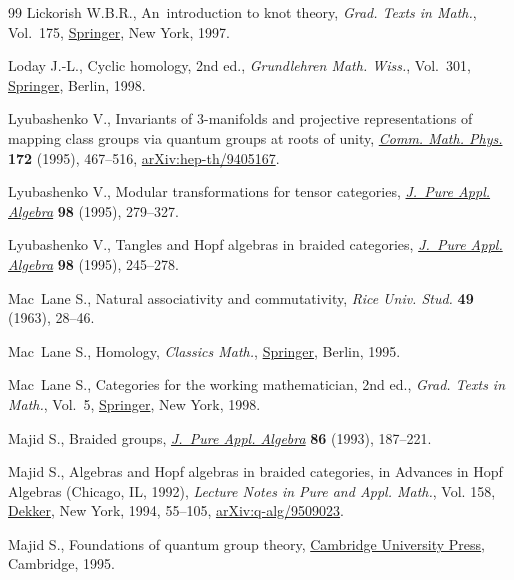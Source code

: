 \begin{thebibliography}{99}
Lickorish W.B.R., An~introduction to knot theory, \textit{Grad. Texts in
 Math.}, Vol.~175, \href{https://doi.org/10.1007/978-1-4612-0691-0}{Springer},
 New York, 1997.

Loday J.-L., Cyclic homology, 2nd ed., \textit{Grundlehren Math. Wiss.}, Vol.~301,
 \href{https://doi.org/10.1007/978-3-662-11389-9}{Springer}, Berlin, 1998.

Lyubashenko V., Invariants of {$3$}-manifolds and projective representations of
 mapping class groups via quantum groups at roots of unity,
 \href{https://doi.org/10.1007/BF02101805}{\textit{Comm. Math. Phys.}}
 \textbf{172} (1995), 467--516,
 \href{http://arxiv.org/abs/hep-th/9405167}{arXiv:hep-th/9405167}.

Lyubashenko V., Modular transformations for tensor categories,
 \href{https://doi.org/10.1016/0022-4049(94)00045-K}{\textit{J.~Pure Appl.
 Algebra}} \textbf{98} (1995), 279--327.

Lyubashenko V., Tangles and {H}opf algebras in braided categories,
 \href{https://doi.org/10.1016/0022-4049(95)00044-W}{\textit{J.~Pure Appl.
 Algebra}} \textbf{98} (1995), 245--278.

Mac~Lane S., Natural associativity and commutativity, \textit{Rice Univ. Stud.}
 \textbf{49} (1963), 28--46.

Mac~Lane S., Homology, \textit{Classics Math.},
 \href{https://doi.org/10.1007/978-3-642-62029-4}{Springer}, Berlin, 1995.

Mac~Lane S., Categories for the working mathematician, 2nd ed., \textit{Grad. Texts in
 Math.}, Vol.~5,
 \href{https://doi.org/10.1007/978-1-4757-4721-8}{Springer}, New York, 1998.

Majid S., Braided groups,
 \href{https://doi.org/10.1016/0022-4049(93)90103-Z}{\textit{J.~Pure Appl.
 Algebra}} \textbf{86} (1993), 187--221.

Majid S., Algebras and {H}opf algebras in braided categories, in Advances in
 {H}opf Algebras ({C}hicago, {IL}, 1992), \textit{Lecture Notes in Pure and
 Appl. Math.}, Vol. 158,
 \href{https://doi.org/10.1201/9781003419792-4}{Dekker}, New York, 1994,
 55--105, \href{http://arxiv.org/abs/q-alg/9509023}{arXiv:q-alg/9509023}.

Majid S., Foundations of quantum group theory,
 \href{https://doi.org/10.1017/CBO9780511613104}{Cambridge University Press},
 Cambridge, 1995.


\end{thebibliography}
